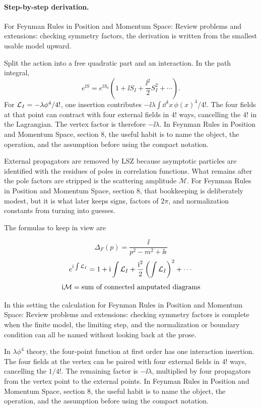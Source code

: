 \paragraph{Step-by-step derivation.}

For Feynman Rules in Position and Momentum Space: Review problems and extensions: checking symmetry factors, the derivation is written from the smallest usable model upward.

Split the action into a free quadratic part and an interaction.  In the path integral,
\[
  e^{\ii S}=e^{\ii S_0}\left(1+\ii S_I+\frac{\ii^2}{2}S_I^2+\cdots\right).
\]
For \(\mathcal L_I=-\lambda\phi^4/4!\), one insertion contributes \(-\ii\lambda\int\dd^4x\,\phi(x)^4/4!\).  The four fields at that point can contract with four external fields in \(4!\) ways, cancelling the \(4!\) in the Lagrangian.  The vertex factor is therefore \(-\ii\lambda\).  In Feynman Rules in Position and Momentum Space, section 8, the useful habit is to name the object, the operation, and the assumption before using the compact notation.

External propagators are removed by LSZ because asymptotic particles are identified with the residues of poles in correlation functions.  What remains after the pole factors are stripped is the scattering amplitude \(\mathcal M\).  For Feynman Rules in Position and Momentum Space, section 8, that bookkeeping is deliberately modest, but it is what later keeps signs, factors of \(2\pi\), and normalization constants from turning into guesses.

The formulas to keep in view are

\[
  \Delta_F(p)=\frac{\ii}{p^2-m^2+\ii\epsilon}
\]
\[
  e^{\mathrm i\int\mathcal L_I}=1+\mathrm i\int\mathcal L_I+\frac{\mathrm i^2}{2}\left(\int\mathcal L_I\right)^2+\cdots
\]
\[
  \mathrm i\mathcal M=\hbox{sum of connected amputated diagrams}
\]

In this setting the calculation for Feynman Rules in Position and Momentum Space: Review problems and extensions: checking symmetry factors is complete when the finite model, the limiting step, and the normalization or boundary condition can all be named without looking back at the prose.




\begin{example}
In \(\lambda\phi^4\) theory, the four-point function at first order has one interaction insertion.  The four fields at the vertex can be paired with four external fields in \(4!\) ways, cancelling the \(1/4!\).  The remaining factor is \(-\ii\lambda\), multiplied by four propagators from the vertex point to the external points.  In Feynman Rules in Position and Momentum Space, section 8, the useful habit is to name the object, the operation, and the assumption before using the compact notation.
\end{example}




